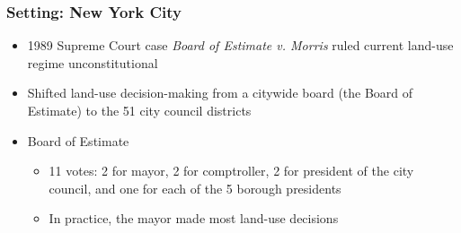 \begin{frame}
    \frametitle{Setting: New York City}
    \begin{itemize}
        \item 1989 Supreme Court case \textit{Board of Estimate v. Morris} ruled current land-use regime unconstitutional
        \item Shifted land-use decision-making from a citywide board (the Board of Estimate) to the 51 city council districts
        \item Board of Estimate
    \begin{itemize}
        \item 11 votes: 2 for mayor, 2 for comptroller, 2 for president of the city council, and one for each of the 5 borough presidents
        \item In practice, the mayor made most land-use decisions
    \end{itemize}
    \end{itemize}
\end{frame}
